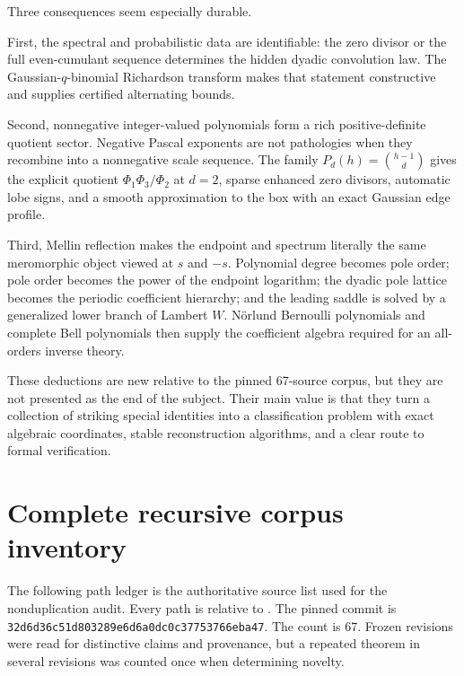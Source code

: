 \documentclass[11pt,oneside]{article}
\numberwithin{equation}{section}
\theoremstyle{definition}
\theoremstyle{remark}
\begin{document}
Three consequences seem especially durable.

First, the spectral and probabilistic data are identifiable: the zero divisor or the full
even-cumulant sequence determines the hidden dyadic convolution law.  The
Gaussian-$q$-binomial Richardson transform makes that statement constructive and supplies
certified alternating bounds.

Second, nonnegative integer-valued polynomials form a rich positive-definite quotient sector.
Negative Pascal exponents are not pathologies when they recombine into a nonnegative scale
sequence.  The family
$P_d(h)=\binom{h-1}{d}$ gives the explicit quotient
$\Phi_1\Phi_3/\Phi_2$ at $d=2$, sparse enhanced zero divisors, automatic lobe signs, and a
smooth approximation to the box with an exact Gaussian edge profile.

Third, Mellin reflection makes the endpoint and spectrum literally the same meromorphic
object viewed at $s$ and $-s$.  Polynomial degree becomes pole order; pole order becomes the
power of the endpoint logarithm; the dyadic pole lattice becomes the periodic coefficient
hierarchy; and the leading saddle is solved by a generalized lower branch of Lambert $W$.
N\"orlund Bernoulli polynomials and complete Bell polynomials then supply the coefficient
algebra required for an all-orders inverse theory.

These deductions are new relative to the pinned 67-source corpus, but they are not presented
as the end of the subject.  Their main value is that they turn a collection of striking
special identities into a classification problem with exact algebraic coordinates, stable
reconstruction algorithms, and a clear route to formal verification.

\appendix
\section{Complete recursive corpus inventory}
\label{p1:app:inventory}

The following path ledger is the authoritative source list used for the nonduplication audit.
Every path is relative to .  The pinned commit is
\texttt{32d6d36c51d803289e6d6a0dc0c37753766eba47}.  The count is 67.  Frozen revisions were
read for distinctive claims and provenance, but a repeated theorem in several revisions was
counted once when determining novelty.
\end{document}
